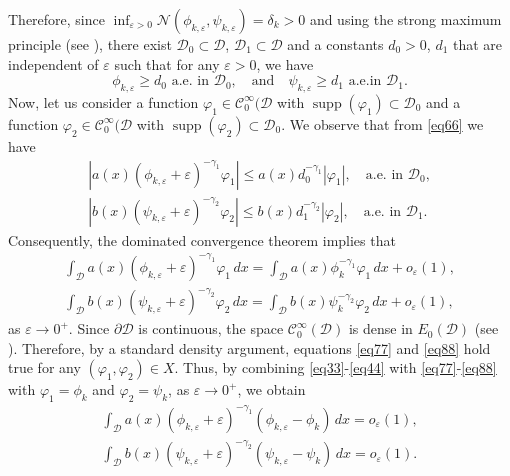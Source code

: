 \documentclass[reqno]{amsart}
\begin{document}
Therefore, since 
$\inf_{\varepsilon>0} \mathcal{N}(\phi_{k,\varepsilon},\psi_{k,\varepsilon})=\delta_k>0$ 
and using the strong maximum principle (see \cite{max}), there exist 
$\mathcal{D}_0\subset \mathcal{D}$, $\mathcal{D}_1\subset \mathcal{D}$ and a constants 
$d_0>0$, $d_1$ that are independent of $\varepsilon$ such that for any $\varepsilon>0$, 
we have
\begin{equation}\label{eq66}
\phi_{k,\varepsilon}\geq d_0 \text{ a.e. in }  \mathcal{D}_0, \quad \text{and}\quad 
\psi_{k,\varepsilon}\geq d_1 \text{ a.e.in } \mathcal{D}_1.
\end{equation}
Now, let us consider a function $\varphi_1\in \mathcal{C}^\infty_0(\mathcal{D}$ with 
$\operatorname{supp}(\varphi_1)\subset \mathcal{D}_0$ and a function 
$\varphi_2\in \mathcal{C}^\infty_0(\mathcal{D}$ with 
$\operatorname{supp}(\varphi_2)\subset \mathcal{D}_0$.
 We observe that from \eqref{eq66} we have
\begin{gather*}
|a(x)(\phi_{k,\varepsilon}+\varepsilon)^{-\gamma_1}\varphi_1|
\leq a(x) d_0^{-\gamma_1}|\varphi_1|,\quad \text{a.e. in } \mathcal{D}_0,\\
|b(x)(\psi_{k,\varepsilon}+\varepsilon)^{-\gamma_2}\varphi_2|
\leq b(x) d_1^{-\gamma_2}|\varphi_2|,\quad \text{a.e. in } \mathcal{D}_1.
\end{gather*}
Consequently, the dominated convergence theorem implies that
\begin{gather}\label{eq77}
\int_\mathcal{D}a(x) (\phi_{k,\varepsilon}+\varepsilon)^{-\gamma_1}\varphi_1\,dx
=\int_\mathcal{D}a(x) \phi_{k}^{-\gamma_1}\varphi_1\,dx+o_\varepsilon(1), \\
\label{eq88}
\int_\mathcal{D}b(x) (\psi_{k,\varepsilon}+\varepsilon)^{-\gamma_2}\varphi_2\,dx
=\int_\mathcal{D}b(x) \psi_{k}^{-\gamma_2}\varphi_2\,dx+o_\varepsilon(1),
\end{gather}
as $\varepsilon\to0^+$. Since $\partial\mathcal{D}$ is continuous, the space 
$\mathcal{C}^\infty_0(\mathcal{D})$ is dense in $E_0(\mathcal{D})$ 
(see \cite[Theorem 6]{density}). 
Therefore, by a standard density argument, equations \eqref{eq77} and \eqref{eq88}
hold true for any $(\varphi_1,\varphi_2)\in X$. Thus, by combining 
\eqref{eq33}-\eqref{eq44} with \eqref{eq77}-\eqref{eq88} with $\varphi_1=\phi_k$ and 
$\varphi_2=\psi_k$, as $\varepsilon\to0^+$, we obtain
\begin{gather*}
\int_\mathcal{D}a(x) (\phi_{k,\varepsilon}+\varepsilon)^{-\gamma_1}
(\phi_{k,\varepsilon}-\phi_k)\,dx=o_\varepsilon(1), \\
\int_\mathcal{D}b(x) (\psi_{k,\varepsilon}+\varepsilon)^{-\gamma_2}(\psi_{k,\varepsilon}
-\psi_k)\,dx=o_\varepsilon(1).
\end{gather*}
\end{document}
